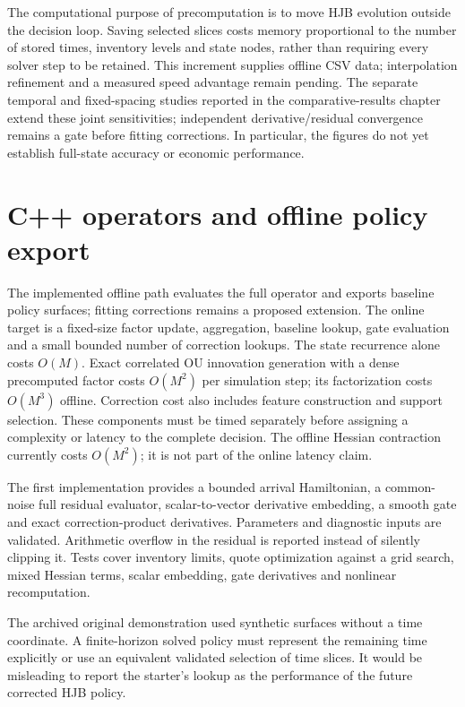 The computational purpose of precomputation is to move HJB evolution outside the decision loop. Saving selected slices costs memory proportional to the number of stored times, inventory levels and state nodes, rather than requiring every solver step to be retained. This increment supplies offline CSV data; interpolation refinement and a measured speed advantage remain pending. The separate temporal and fixed-spacing studies reported in the comparative-results chapter extend these joint sensitivities; independent derivative/residual convergence remains a gate before fitting corrections. In particular, the figures do not yet establish full-state accuracy or economic performance.

\clearpage
\section{C++ operators and offline policy export}


The implemented offline path evaluates the full operator and exports baseline policy surfaces; fitting corrections remains a proposed extension. The online target is a fixed-size factor update, aggregation, baseline lookup, gate evaluation and a small bounded number of correction lookups. The state recurrence alone costs $O(M)$. Exact correlated OU innovation generation with a dense precomputed factor costs $O(M^2)$ per simulation step; its factorization costs $O(M^3)$ offline. Correction cost also includes feature construction and support selection. These components must be timed separately before assigning a complexity or latency to the complete decision. The offline Hessian contraction currently costs $O(M^2)$; it is not part of the online latency claim.

The first implementation provides a bounded arrival Hamiltonian, a common-noise full residual evaluator, scalar-to-vector derivative embedding, a smooth gate and exact correction-product derivatives. Parameters and diagnostic inputs are validated. Arithmetic overflow in the residual is reported instead of silently clipping it. Tests cover inventory limits, quote optimization against a grid search, mixed Hessian terms, scalar embedding, gate derivatives and nonlinear recomputation.

The archived original demonstration used synthetic surfaces without a time coordinate. A finite-horizon solved policy must represent the remaining time explicitly or use an equivalent validated selection of time slices. It would be misleading to report the starter's lookup as the performance of the future corrected HJB policy.

